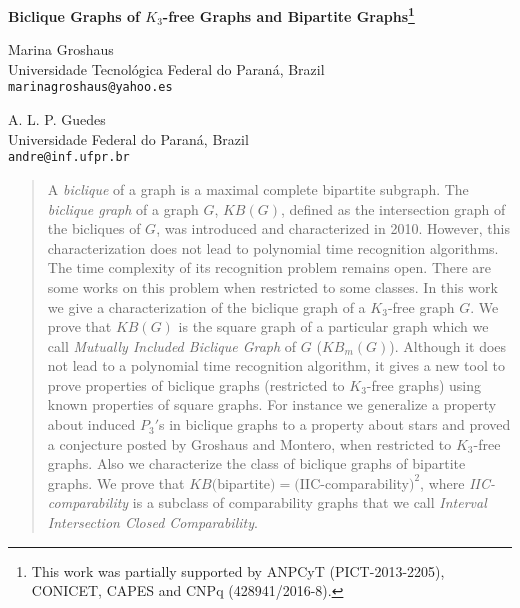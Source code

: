 \documentclass{article}
\newcommand{\define}[1]{\emph{#1}}
\def\titulo{Biclique Graphs of $K_3$-free Graphs and Bipartite Graphs}
\begin{document}
%
\thispagestyle{empty}
\begin{center}
\Large
 {\bf \titulo\footnote{This work was partially supported by
  ANPCyT (PICT-2013-2205), %
  CONICET, %
  CAPES and %
  CNPq (428941/2016-8). %
}
}
\vspace*{1cm}

\large
Marina Groshaus \\
 \normalsize
Universidade Tecnológica Federal do Paraná, Brazil\\
\texttt{marinagroshaus@yahoo.es} \\

\vspace*{1cm}


\large
A. L. P. Guedes \\ %
 \normalsize
Universidade Federal do Paraná, Brazil\\
\texttt{andre@inf.ufpr.br}\\
\vspace*{.5cm}

\end{center}

\begin{abstract}
  A \define{biclique} of a graph is a maximal complete bipartite subgraph.
  The  \define{biclique graph}  of a  graph $G$,  $KB(G)$, defined  as the
  intersection  graph  of  the  bicliques of  $G$,  was  introduced  and
  characterized in 2010.
%
  However,  this  characterization  does  not lead  to  polynomial  time
  recognition  algorithms.   The  time  complexity  of  its  recognition
  problem  remains open.   There are  some  works on  this problem  when
  restricted to some classes.
%
  In this  work we give  a characterization of  the biclique graph  of a
  $K_3$-free graph $G$.  We prove that  $KB(G)$ is the square graph of a
  particular graph which we  call \define{Mutually Included Biclique Graph}
  of $G$  ($KB_m(G)$).  Although it does  not lead to a  polynomial time
  recognition  algorithm, it  gives a  new tool  to prove  properties of
  biclique  graphs   (restricted  to  $K_3$-free  graphs)   using  known
  properties of square graphs. 
%
  For instance  we generalize a property  about induced ${P_3}'$s in biclique
  graphs to a property about stars and proved a conjecture posted 
  by Groshaus and Montero, when restricted to $K_3$-free graphs.
%
  Also we characterize the class of biclique graphs of bipartite
  graphs.  We prove  that  $KB($bipartite$) =  ($IIC-comparability$)^2$,
  where \define{IIC-compa\-rability}  is a subclass of  comparability graphs
  that we call \define{Interval Intersection Closed Comparability}.
%
\end{abstract}
\end{document}
